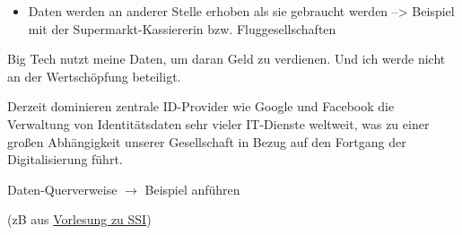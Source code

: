 \vspace{0.3cm}



\begin{Problem}

\begin{itemize}
  \item Daten werden an anderer Stelle erhoben als sie gebraucht werden --> Beispiel mit der Supermarkt-Kassiererin bzw. Fluggesellschaften
\end{itemize}

\end{Problem}

\vspace{0.3cm}


\begin{Problem}

Big Tech nutzt meine Daten, um daran Geld zu verdienen. Und ich werde nicht an der Wertschöpfung beteiligt.

\end{Problem}

\vspace{0.3cm}


\begin{Problem}

Derzeit dominieren zentrale ID-Provider wie Google und Facebook die Verwaltung von Identitätsdaten sehr vieler IT-Dienste weltweit, was zu einer großen Abhängigkeit unserer Gesellschaft in Bezug auf den Fortgang der Digitalisierung führt.

\end{Problem}

\vspace{0.3cm}


\begin{Problem}

Daten-Querverweise $\rightarrow$ Beispiel anführen 

(zB aus \href{https://norbert-pohlmann.com/glossar-cyber-sicherheit/self-sovereign-identity-ssi/}{Vorlesung zu SSI})

\end{Problem}

\vspace{0.5cm}
